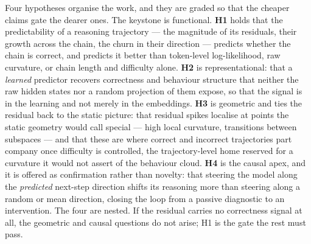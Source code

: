 Four hypotheses organise the work, and they are graded so that the cheaper claims
gate the dearer ones. The keystone is functional. \textbf{H1} holds that the
predictability of a reasoning trajectory --- the magnitude of its residuals,
their growth across the chain, the churn in their direction --- predicts whether
the chain is correct, and predicts it better than token-level log-likelihood, raw
curvature, or chain length and difficulty alone. \textbf{H2} is representational:
that a \emph{learned} predictor recovers correctness and behaviour structure that
neither the raw hidden states nor a random projection of them expose, so that the
signal is in the learning and not merely in the embeddings. \textbf{H3} is
geometric and ties the residual back to the static picture: that residual spikes
localise at points the static geometry would call special --- high local
curvature, transitions between subspaces --- and that these are where correct and
incorrect trajectories part company once difficulty is controlled, the
trajectory-level home  reserved for a curvature it would not
assert of the behaviour cloud. \textbf{H4} is the causal apex, and it is offered
as confirmation rather than novelty: that steering the model along the
\emph{predicted} next-step direction shifts its reasoning more than steering along
a random or mean direction, closing the loop from a passive diagnostic to an
intervention. The four are nested. If the residual carries no correctness signal
at all, the geometric and causal questions do not arise; H1 is the gate the rest
must pass.


